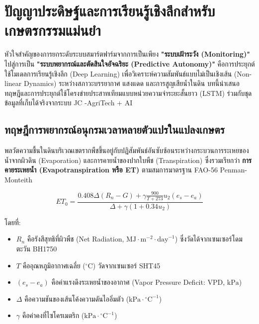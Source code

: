 \chapter{ปัญญาประดิษฐ์และการเรียนรู้เชิงลึกสำหรับเกษตรกรรมแม่นยำ}
\label{chap:deeplearning}

หัวใจสำคัญของการยกระดับระบบสมาร์ตฟาร์มจากการเป็นเพียง \textbf{"ระบบเฝ้าระวัง (Monitoring)"} ไปสู่การเป็น \textbf{"ระบบพยากรณ์และตัดสินใจอัจฉริยะ (Predictive Autonomy)"} คือการประยุกต์ใช้โมเดลการเรียนรู้เชิงลึก (Deep Learning) เพื่อวิเคราะห์ความสัมพันธ์แบบไม่เป็นเชิงเส้น (Non-linear Dynamics) ระหว่างสภาวะบรรยากาศ แสงแดด และการสูญเสียน้ำในดิน บทนี้นำเสนอทฤษฎีและการประยุกต์ใช้โครงข่ายประสาทเทียมแบบหน่วยความจำระยะสั้นยาว (LSTM) ร่วมกับชุดข้อมูลที่เก็บได้จริงจากระบบ JC -AgriTech + AI

\section{ทฤษฎีการพยากรณ์อนุกรมเวลาหลายตัวแปรในแปลงเกษตร}

พลวัตความชื้นในดินบริเวณเขตรากพืชขึ้นอยู่กับปฏิสัมพันธ์อันซับซ้อนระหว่างกระบวนการระเหยของน้ำจากผิวดิน (Evaporation) และการคายน้ำของปากใบพืช (Transpiration) ซึ่งรวมเรียกว่า \textbf{การคายระเหยน้ำ (Evapotranspiration หรือ ET)} ตามสมการมาตรฐาน FAO-56 Penman-Monteith

\begin{equation}
    ET_0 = \frac{0.408 \Delta (R_n - G) + \gamma \frac{900}{T+273} u_2 (e_s - e_a)}{\Delta + \gamma(1 + 0.34 u_2)}
    \label{eq:penman_monteith}
\end{equation}

โดยที่:
\begin{itemize}
    \item $R_n$ คือรังสีสุทธิที่ผิวพืช (Net Radiation, $\text{MJ}\cdot\text{m}^{-2}\cdot\text{day}^{-1}$) ซึ่งวัดได้จากเซนเซอร์โดมตะวัน BH1750
    \item $T$ คืออุณหภูมิอากาศเฉลี่ย ($^\circ\text{C}$) วัดจากเซนเซอร์ SHT45
    \item $(e_s - e_a)$ คือค่าแรงดึงระเหยน้ำของอากาศ (Vapor Pressure Deficit: VPD, $\text{kPa}$)
    \item $\Delta$ คือความชันของเส้นโค้งความดันไออิ่มตัว ($\text{kPa}\cdot{^\circ\text{C}}^{-1}$)
    \item $\gamma$ คือค่าคงที่ไซโครเมตริก ($\text{kPa}\cdot{^\circ\text{C}}^{-1}$)
\end{itemize}

